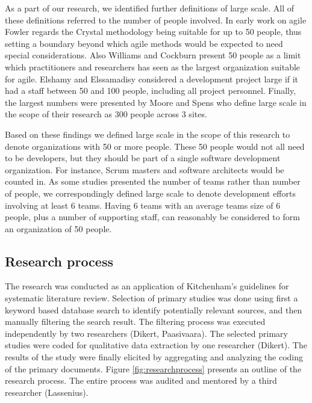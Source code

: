 \documentclass[preprint,authoryear,12pt]{elsarticle}
\begin{document}
As a part of our research, we identified further definitions of large scale. All
of these definitions referred to the number of people involved.
In early work on agile Fowler \cite{Fowler2000} regards the Crystal methodology
being suitable for up to 50 people, thus setting a boundary beyond which agile
methods would be expected to need special considerations. Also Williams and
Cockburn \cite{Williams2003} present 50 people as a limit which practitioners
and researchers has seen as the largest organization suitable for agile.
Elshamy and Elssamadisy \cite{Elshamy2006} considered a development project
large if it had a staff between 50 and 100 people, including all project
personnel. Finally, the largest numbers were presented by Moore and Spens
\cite{Moore2008} who define large scale in the scope of their research as 300
people across 3 sites.

Based on these findings we defined large scale in the scope of this research to
denote organizations with 50 or more people. These 50 people would not all need
to be developers, but they should be part of a single software development
organization. For instance, Scrum masters and software architects would be
counted in. As some studies presented the number of teams rather than number of
people, we correspondingly defined large scale to denote development efforts
involving at least 6 teams. Having 6 teams with an average teams size of 6
people, plus a number of supporting staff, can reasonably be considered to form
an organization of 50 people.


% 



\subsection{Research process}

The research was conducted as an application of Kitchenham's
\cite{Kitchenham2007} guidelines for systematic literature review. Selection of
primary studies was done using first a keyword based database search to identify
potentially relevant sources, and then manually filtering the search result. The
filtering process was executed independently by two researchers (Dikert,
Paasivaara). The selected primary studies were coded for qualitative data
extraction by one researcher (Dikert). The results of the study were finally
elicited by aggregating and analyzing the coding of the primary documents.
Figure \ref{fig:researchprocess} presents an outline of the research process.
The entire process was audited and mentored by a third researcher (Lassenius).
\end{document}
